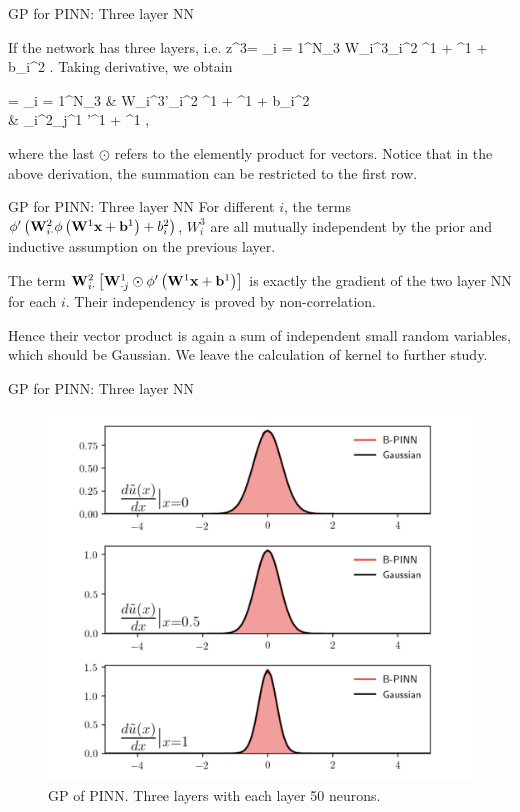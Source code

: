 \documentclass{beamer}
\begin{document}
\begin{frame}{GP for PINN: Three layer NN}
\par
If the network has three layers, i.e.
\bequn
	z^3\lp \mfx \rp = \sum_{i = 1}^{N_3} W_i^3\phi\lp \mfW_{i\cdot}^2  \phi\lp \mfW^1 \mfx + \mfb^1 \rp + b_i^2 \rp.
\eequn
Taking derivative, we obtain
\bequn
	\begin{aligned}
		 = \sum_{i = 1}^{N_3} & W_i^3\phi'\lp \mfW_{i\cdot}^2  \phi\lp \mfW^1  \mfx + \mfb^1 \rp + b_i^2 \rp		\\
		&  \mfW_{i\cdot}^2\lb \mfW_{\cdot j}^1 \odot \phi'\lp \mfW^1 \mfx + \mfb^1 \rp \rb,
	\end{aligned}
\eequn
where the last $\odot$ refers to the elemently product for vectors. Notice that in the above derivation, the summation can be restricted to the first row.
\end{frame}


\begin{frame}{GP for PINN: Three layer NN}
For different $i$, the terms $\phi'\left( \mathbf{W}_{i\cdot}^2  \phi\left( \mathbf{W}^1  \mathbf{x} + \mathbf{b}^1 \right) + b_i^2 \right)$, $W_i^3$ are all mutually independent by the prior and inductive assumption on the previous layer. 
\par
The term $\mathbf{W}_{i\cdot}^2\left[ \mathbf{W}_{\cdot j}^1 \odot \phi'\left( \mathbf{W}^1 \mathbf{x} + \mathbf{b}^1 \right) \right]$ is exactly the gradient of the two layer NN for each $i$. Their independency is proved by non-correlation.
\par
Hence their vector product is again a sum of independent small random variables, which should be Gaussian. We leave the calculation of kernel to further study.
\end{frame}


\begin{frame}{GP for PINN: Three layer NN}
	\begin{figure}[h]
  \centering
  \centerline{\includegraphics[width=0.6\linewidth]{PINNGP.png}}
  \caption{
 GP of PINN. Three layers with each layer 50 neurons.}
\end{figure}
\end{frame}
\end{document}
